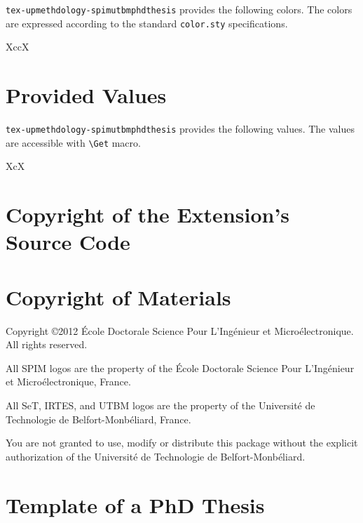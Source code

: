 \documentclass[article,english]{upmethodology-document}
\gdef\upmextensiondoccolorlist{}
\gdef\upmextensiondocvaluelist{}
\begin{document}
\texttt{tex-upmethdology-spimutbmphdthesis} provides the following colors. The colors are expressed according to the standard \texttt{color.sty} specifications.

\begin{mtabular}{4}{XccX}
\upmextensiondoccolorlist
\end{mtabular}

\section{Provided Values}

\texttt{tex-upmethdology-spimutbmphdthesis} provides the following values. The values are accessible with \texttt{{\textbackslash}Get} macro.

\begin{mtabular}{3}{XcX}
\end{mtabular}

\section{Copyright of the Extension's Source Code}



\section{Copyright of Materials}

Copyright \copyright 2012 \'Ecole Doctorale Science Pour L'Ing\'enieur et Micro\'electronique. All rights reserved.

All SPIM logos are the property of the \'Ecole Doctorale Science Pour L'Ing\'enieur et Micro\'electronique, France.

All SeT, IRTES, and UTBM logos are the property of the Universit\'e de Technologie de Belfort-Monb\'eliard, France.

You are not granted to use, modify or distribute this package without the explicit authorization of the Universit\'e de Technologie de Belfort-Monb\'eliard.

\section{Template of a PhD Thesis}
\end{document}
